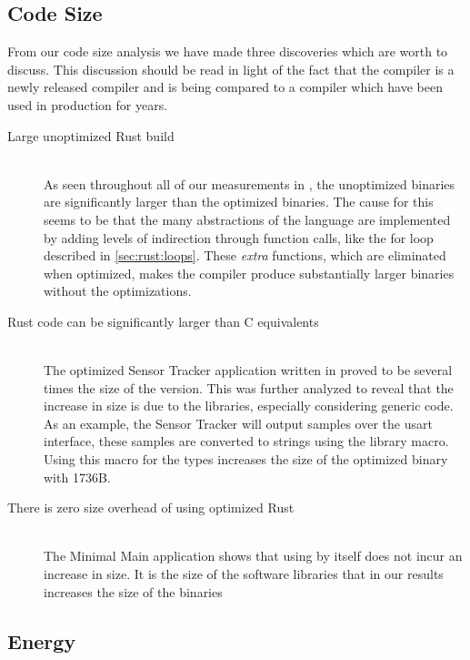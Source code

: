 \subsection{Code Size}

From our code size analysis we have made three discoveries which are worth to discuss.
This discussion should be read in light of the fact that the {\rust} compiler is a newly released compiler and is being compared to a {\C} compiler which have been used in production for years.

\begin{description}

\item [Large unoptimized Rust build] \hfill \\
  As seen throughout all of our measurements in {\rust}, the unoptimized binaries are significantly larger than the optimized binaries.
  The cause for this seems to be that the many abstractions of the {\rust} language are implemented by adding levels of indirection through function calls, like the for loop described in \autoref{sec:rust:loops}.
  These \emph{extra} functions, which are eliminated when optimized, makes the compiler produce substantially larger binaries without the optimizations.

\item [Rust code can be significantly larger than C equivalents] \hfill \\
  The optimized Sensor Tracker application written in {\rust} proved to be several times the size of the {\C} version.
  This was further analyzed to reveal that the increase in size is due to the {\rust} libraries, especially considering generic code.
  As an example, the Sensor Tracker will output samples over the \gls{usart} interface, these samples are converted to strings using the {\core} library  macro.
  Using this macro for the types  increases the size of the optimized binary with 1736B.

\item [There is zero size overhead of using optimized Rust] \hfill \\
  The Minimal Main application shows that using {\rust} by itself does not incur an increase in size.
  It is the size of the software libraries that in our results increases the size of the {\rust} binaries

\end{description}

\subsection{Energy}

